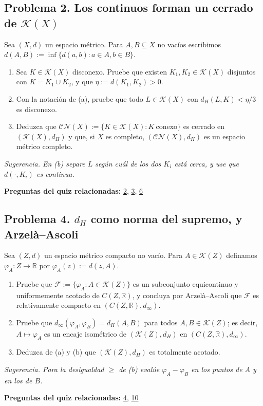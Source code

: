 \documentclass[11pt,a4paper]{article}
\providecommand{\lt}{<}\providecommand{\gt}{>}
\begin{document}
\subsection*{\hypertarget{prob-2}{}Problema 2. Los continuos forman un cerrado de $\mathcal K(X)$}
Sea $(X,d)$ un espacio métrico. Para $A,B\subseteq X$ no vacíos escribimos $d(A,B):=\inf\{d(a,b):a\in A, b\in B\}$.
\begin{enumerate}[label=(\alph*),leftmargin=2.2em,itemsep=2pt]
\item[(a)] Sea $K\in\mathcal K(X)$ disconexo. Pruebe que existen $K_1,K_2\in\mathcal K(X)$ disjuntos con $K=K_1\cup K_2$, y que $\eta:=d(K_1,K_2)\gt 0$.
\item[(b)] Con la notación de (a), pruebe que todo $L\in\mathcal K(X)$ con $d_H(L,K)\lt \eta/3$ es disconexo.
\item[(c)] Deduzca que $\mathcal{CN}(X):=\{K\in\mathcal K(X):K\ \text{conexo}\}$ es cerrado en $(\mathcal K(X),d_H)$ y que, si $X$ es completo, $(\mathcal{CN}(X),d_H)$ es un espacio métrico completo.
\end{enumerate}
{\small\itshape Sugerencia. En (b) separe $L$ según cuál de los dos $K_i$ está cerca, y use que $d(\cdot,K_i)$ es continua.}
\par{\small\textbf{Preguntas del quiz relacionadas:} \hyperlink{r-2}{2}, \hyperlink{r-3}{3}, \hyperlink{r-6}{6}}
\subsection*{\hypertarget{prob-4}{}Problema 4. $d_H$ como norma del supremo, y Arzelà–Ascoli}
Sea $(Z,d)$ un espacio métrico compacto no vacío. Para $A\in\mathcal K(Z)$ definamos $\varphi_A\colon Z\to\mathbb{R}$ por $\varphi_A(z):=d(z,A)$.
\begin{enumerate}[label=(\alph*),leftmargin=2.2em,itemsep=2pt]
\item[(a)] Pruebe que $\mathcal F:=\{\varphi_A:A\in\mathcal K(Z)\}$ es un subconjunto equicontinuo y uniformemente acotado de $C(Z,\mathbb{R})$, y concluya por Arzelà–Ascoli que $\mathcal F$ es relativamente compacto en $(C(Z,\mathbb{R}),d_\infty)$.
\item[(b)] Pruebe que $d_\infty(\varphi_A,\varphi_B)=d_H(A,B)$ para todos $A,B\in\mathcal K(Z)$; es decir, $A\mapsto\varphi_A$ es un encaje isométrico de $(\mathcal K(Z),d_H)$ en $(C(Z,\mathbb{R}),d_\infty)$.
\item[(c)] Deduzca de (a) y (b) que $(\mathcal K(Z),d_H)$ es totalmente acotado.
\end{enumerate}
{\small\itshape Sugerencia. Para la desigualdad $\ge$ de (b) evalúe $\varphi_A-\varphi_B$ en los puntos de $A$ y en los de $B$.}
\par{\small\textbf{Preguntas del quiz relacionadas:} \hyperlink{r-4}{4}, \hyperlink{r-10}{10}}
\end{document}
